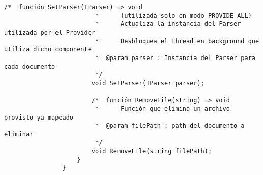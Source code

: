 \begin{lstlisting}[language=lCSharp]
                        /*  función SetParser(IParser) => void
                         *      (utilizada solo en modo PROVIDE_ALL)
                         *      Actualiza la instancia del Parser utilizada por el Provider
                         *      Desbloquea el thread en background que utiliza dicho componente
                         *  @param parser : Instancia del Parser para cada documento
                         */
                        void SetParser(IParser parser);
                
                        /*  función RemoveFile(string) => void
                         *      Función que elimina un archivo provisto ya mapeado
                         *  @param filePath : path del documento a eliminar
                         */
                        void RemoveFile(string filePath);
                    }
                }
            \end{lstlisting}
\newpage
